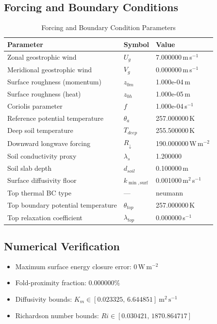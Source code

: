 \subsection{Forcing and Boundary Conditions}
\begin{table}[htbp]
\centering
\caption{Forcing and Boundary Condition Parameters}
\label{tab:scm_parameters_sheba_fd_sheba_160x2m_12h_report}
\begin{tabular}{lll}
\hline
{\bfseries Parameter} & {\bfseries Symbol} & {\bfseries Value} \\
\hline
Zonal geostrophic wind & $U_g$ & 7.000000\,m\,s$^{-1}$ \\
Meridional geostrophic wind & $V_g$ & 0.000000\,m\,s$^{-1}$ \\
Surface roughness (momentum) & $z_{0m}$ & 1.000e-04\,m \\
Surface roughness (heat) & $z_{0h}$ & 1.000e-05\,m \\
Coriolis parameter & $f$ & 1.000e-04\,s$^{-1}$ \\
Reference potential temperature & $\theta_a$ & 257.000000\,K \\
Deep soil temperature & $T_{deep}$ & 255.500000\,K \\
Downward longwave forcing & $R_{\downarrow}$ & 190.000000\,W\,m$^{-2}$ \\
Soil conductivity proxy & $\lambda_s$ & 1.200000 \\
Soil slab depth & $d_{soil}$ & 0.100000\,m \\
Surface diffusivity floor & $k_{\min,\mathrm{surf}}$ & 0.001000\,m$^2$\,s$^{-1}$ \\
Top thermal BC type & --- & neumann \\
Top boundary potential temperature & $\theta_{top}$ & 257.000000\,K \\
Top relaxation coefficient & $\lambda_{top}$ & 0.000000\,s$^{-1}$ \\
\hline
\end{tabular}
\end{table}

\subsection{Numerical Verification}
\begin{itemize}
  \item Maximum surface energy closure error:
  $0\,\mathrm{W\,m^{-2}}$
  \item Fold-proximity fraction:
  $0.000000\%$
  \item Diffusivity bounds:
  $K_m \in [0.023325,\,6.644851]~\mathrm{m^2\,s^{-1}}$
  \item Richardson number bounds:
  $Ri \in [0.030421,\,1870.864717]$
\end{itemize}


